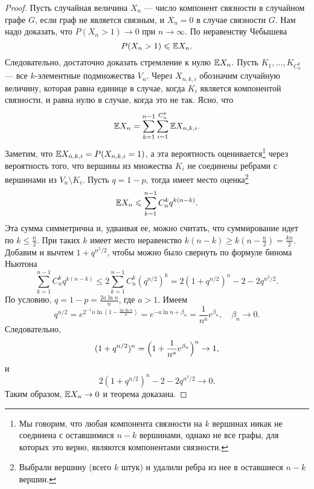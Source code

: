 \begin{proof}
    Пусть случайная величина $X_n$ --- число компонент связности в случайном графе $G$, если граф не является связным, и $X_n = 0$ в случае связности $G$.
    Нам надо доказать, что $P(X_n > 1) \to 0$ при $n \to \infty$.
    По неравенству Чебышева
    \[
        P(X_n > 1) \leqslant \mathbb{E} X_n.
    \]
    Следовательно, достаточно доказать стремление к нулю $\mathbb{E} X_n$.
    Пусть $K_1, \ldots, K_{C_n^k}$ --- все $k$-элементные подмножества $V_n$.
    Через $X_{n, k, i}$ обозначим случайную величину, которая равна единице в случае, когда $K_i$ является компонентой связности, и равна нулю в случае, когда это не так.
    Ясно, что
    \[
        \mathbb{E} X_n = \sum_{k = 1}^{n - 1} \sum_{i = 1}^{C_n^k} \mathbb{E} X_{n, k, i}.
    \]
    Заметим, что $\mathbb{E} X_{n, k, i} = P(X_{n, k, i} = 1)$, а эта вероятность оценивается\footnote{Мы говорим, что любая компонента связности на $k$ вершинах никак не соединена с оставшимися $n - k$ вершинами, однако не все графы, для которых это верно, являются компонентами связности.} через вероятность того, что вершины из множества $K_i$ не соединены ребрами с вершинами из $V_n \setminus K_i$.
    Пусть $q = 1-p$, тогда имеет место оценка\footnote{Выбрали вершину (всего $k$ штук) и удалили ребра из нее в оставшиеся $n - k$ вершин.}
    \[
        \mathbb{E} X_n \leqslant \sum_{k = 1}^{n - 1} C_n^k q^{k(n - k)}.
    \]
    Эта сумма симметрична и, удваивая ее, можно считать, что суммирование идет по $k \leqslant \frac{n}{2}$.
    При таких $k$ имеет место неравенство $k (n - k) \geqslant k (n - \frac{n}{2}) = \frac{kn}{2}$.
    Добавим и вычтем $1 + q^{n^{2} / 2}$, чтобы можно было свернуть по формуле бинома Ньютона
    $$
    \sum_{k = 1}^{n - 1}C_n^k q^{k(n - k)} \leqslant 2 \sum_{k = 1}^{n - 1} C_n^k (q^{n / 2})^k = 2(1 + q^{n / 2})^n - 2 - 2q^{n^2 / 2}.
    $$
    По условию, $q = 1 - p = \frac{2a \ln n}{n}$, где $a > 1$.
    Имеем
    $$
    q^{n / 2} = e^{2^{-1}n \ln(1 - \frac{2a \ln n}{n})} = e^{-a \ln n + \beta_n} = \frac{1}{n^a}e^{\beta_n}, \quad \beta_n \to 0.
    $$
    Следовательно,
    $$
    (1 + q^{n/2})^n = \Bigl( 1 + \frac{1}{n^a}e^{\beta_n} \Bigr)^n \to 1,
    $$
    и
    $$
    2(1 + q^{n / 2})^n - 2 - 2q^{n^2 / 2} \to 0.
    $$
    Таким образом, $\mathbb{E} X_n \to 0$ и теорема доказана.
\end{proof}